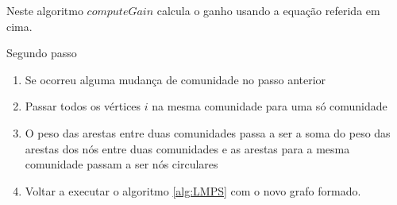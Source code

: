 Neste algoritmo $computeGain$ calcula o ganho usando a equação referida em cima.

\begin{algorithm}
\caption{Segundo passo}
	\begin{enumerate}
		\item Se ocorreu alguma mudança de comunidade no passo anterior
		\item Passar todos os vértices $i$ na mesma comunidade para uma só comunidade
		\item O peso das arestas entre duas comunidades passa a ser a soma do peso das arestas dos nós entre duas comunidades e as arestas para a mesma comunidade passam a ser nós circulares
		\item Voltar a executar o algoritmo \ref{alg:LMPS} com o novo grafo formado.
	\end{enumerate}
\end{algorithm}

